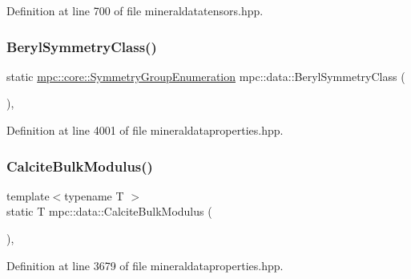 Definition at line 700 of file mineraldatatensors.\+hpp.

\mbox{\label{namespacempc_1_1data_ac282c4fe86ec7c650ff396bbf915af6d}} 
\subsubsection{\texorpdfstring{Beryl\+Symmetry\+Class()}{BerylSymmetryClass()}}
{\footnotesize\ttfamily static \mbox{\hyperlink{namespacempc_1_1core_a9d979684062547055a0ef5c13077bad8}{mpc\+::core\+::\+Symmetry\+Group\+Enumeration}} mpc\+::data\+::\+Beryl\+Symmetry\+Class (\begin{DoxyParamCaption}{ }\end{DoxyParamCaption})\hspace{0.3cm}{\ttfamily [inline]}, {\ttfamily [static]}}



Definition at line 4001 of file mineraldataproperties.\+hpp.

\mbox{\label{namespacempc_1_1data_abbbe7593f977049fa35939683b4372a5}} 
\subsubsection{\texorpdfstring{Calcite\+Bulk\+Modulus()}{CalciteBulkModulus()}}
{\footnotesize\ttfamily template$<$typename T $>$ \\
static T mpc\+::data\+::\+Calcite\+Bulk\+Modulus (\begin{DoxyParamCaption}{ }\end{DoxyParamCaption})\hspace{0.3cm}{\ttfamily [inline]}, {\ttfamily [static]}}



Definition at line 3679 of file mineraldataproperties.\+hpp.

\mbox{\label{namespacempc_1_1data_a6113b36cf32d3a6a6646ebe81d20ba1c}} 
